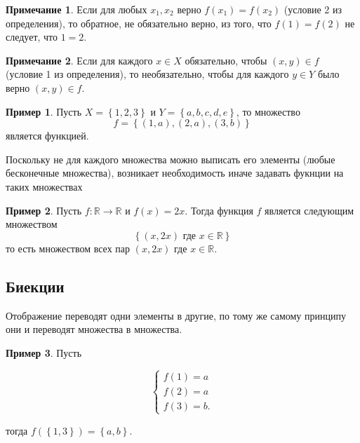 \documentclass[]{article}
\theoremstyle{theorem}
\theoremstyle{definition}
\newtheorem{ex}{Пример}
\newtheorem*{nt}{Примечание}
\begin{document}
\begin{nt}
	Если для любых $x_1, x_2$ верно $f(x_1)=f(x_2)$ (условие 2 из определения), то обратное, не обязательно верно, из того, что $f(1)=f(2)$ не следует, что $1=2$.
\end{nt}

\begin{nt}
	Если для каждого $x\in X$ обязательно, чтобы $(x,y)\in f$ (условие 1 из определения), то необязательно, чтобы для каждого $y\in Y$ было верно $(x,y)\in f$.
\end{nt}

\begin{ex}
	Пусть $X=\left\{1,2,3\right\}$ и $Y=\left\{a,b,c,d,e\right\}$, то множество 
\begin{equation}
	f=\left\{(1,a),(2,a),(3,b)\right\}
\end{equation}
является функцией.
\end{ex}
	
	Поскольку не для каждого множества можно выписать его элементы (любые бесконечные множества), возникает необходимость иначе задавать фукнции на таких множествах
	
	\begin{ex}
		Пусть $f:\mathbb{R}\rightarrow\mathbb{R}$ и $f(x)=2x$.
	Тогда функция $f$ является следующим множеством 
	\begin{equation}
		\left\{(x,2x)\text{ где }x\in\mathbb{R}\right\}
	\end{equation}
	то есть множеством всех пар $(x,2x)$ где $x\in\mathbb{R}$.
	\end{ex}
	
	\subsection{Биекции}
	
	Отображение переводят одни элементы в другие, по тому же самому принципу они и переводят множества в множества. \begin{ex}
		Пусть
	
		\begin{equation}
		\begin{cases}
			f(1)=a
			\\
			f(2)=a
			\\
			f(3)=b.
		\end{cases}
	\end{equation}
	
	тогда $f(\left\{1,3\right\})=\left\{a,b\right\}$.
	\end{ex}
	
\end{document}
